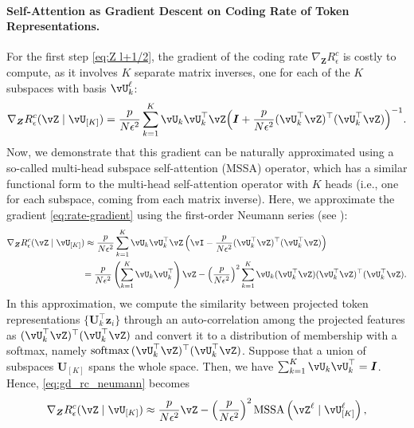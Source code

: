 \documentclass[../../book-main.tex]{subfiles}
\begin{document}
\paragraph{Self-Attention as Gradient Descent on Coding Rate of Token Representations.} For the first step \eqref{eq:Z l+1/2}, the gradient of the coding rate \(\nabla_{\bm Z} R^c_\epsilon\) is costly to compute, as it involves \(K\) separate matrix inverses, one for each of the \(K\) subspaces with basis \(\vU_{k}^{\ell}\):
\begin{equation}
    \nabla_{\bm Z} R_{\epsilon}^c(\vZ \mid \vU_{[K]})
    = \frac{p}{N\epsilon^2}\sum_{k=1}^K \vU_k\vU_k^\top\vZ\Big(\I +
    \frac{p}{N\epsilon^2}(\vU_k^\top\vZ)^\top(\vU_k^\top\vZ)\Big)^{-1}.
    \label{eq:rate-gradient}
\end{equation}
Now, we demonstrate that this gradient can be naturally approximated using a so-called multi-head subspace self-attention (MSSA) operator, which has a similar functional form to the multi-head self-attention operator \citep{vaswani2017attention} with \(K\) heads (i.e., one for each subspace, coming from each matrix inverse). Here, we approximate the gradient \eqref{eq:rate-gradient} using the first-order Neumann series (see ):
\begin{align}\label{eq:gd_rc_neumann}
    \nabla_{\bm Z} R_{\epsilon}^{c}(\vZ \mid \vU_{[K]}) 
    &\approx \frac{p}{N\epsilon^2} \sum_{k = 1}^{K}\vU_{k}\vU_{k}^\top\vZ\left(\vI - \frac{p}{N\epsilon^2} (\vU_{k}^\top\vZ)^\top(\vU_{k}^\top\vZ)\right) \notag \\
    &{= \frac{p}{N\epsilon^2} \left(\sum_{k = 1}^{K} \vU_{k}\vU_{k}^\top\right)\vZ -  \left( \frac{p}{N\epsilon^2}\right)^2\sum_{k = 1}^{K} \vU_{k}(\vU_{k}^\top\vZ)(\vU_{k}^\top\vZ)^\top(\vU_{k}^\top\vZ)}.
\end{align}
In this approximation, we compute the similarity between projected token representations $\{\bm U_k^\top\bm z_i\}$ through an auto-correlation among the projected features as $(\vU_{k}^\top\vZ)^\top(\vU_{k}^\top\vZ)$ and convert it to a distribution of membership with a softmax, namely $\softmax{(\vU_{k}^\top\vZ)^\top(\vU_{k}^\top\vZ)}$. 
Suppose that a union of subspaces $\bm U_{[K]}$ spans the whole space. Then, we have $\sum_{k = 1}^{K} \vU_{k}\vU_{k}^\top = \bm I$. Hence, \eqref{eq:gd_rc_neumann} becomes
\begin{align}\label{eq:grad Rc}
    \nabla_{\bm Z} R_{\epsilon}^{c}(\vZ \mid \vU_{[K]}) 
     \approx  \frac{p}{N\epsilon^2} \vZ -  \left( \frac{p}{N\epsilon^2}\right)^2 \MSSA\left(\vZ^{\ell} \mid \vU_{[K]}^{\ell}\right),
\end{align}
\end{document}
